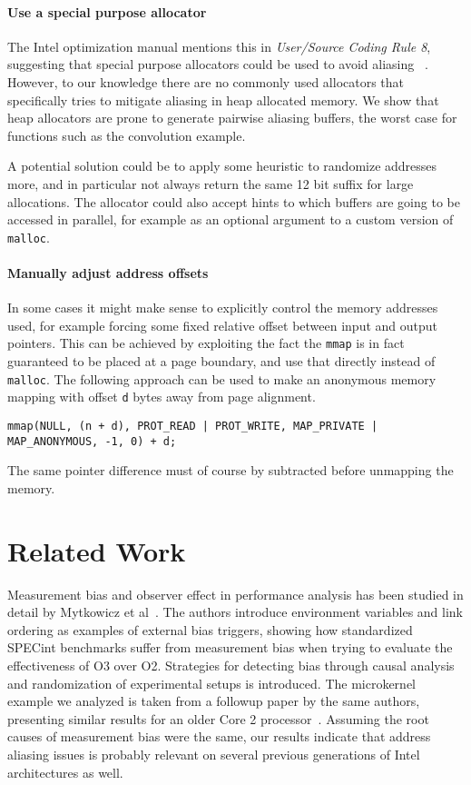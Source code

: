 \documentclass[prodmode,acmtaco]{acmsmall}
\begin{document}
\paragraph{Use a special purpose allocator}
The Intel optimization manual mentions this in \emph{User/Source Coding Rule 8}, suggesting that special purpose allocators could be used to avoid aliasing ~\cite{OptimizationManual}.
However, to our knowledge there are no commonly used allocators that specifically tries to mitigate aliasing in heap allocated memory.
We show that heap allocators are prone to generate pairwise aliasing buffers, the worst case for functions such as the convolution example.

A potential solution could be to apply some heuristic to randomize addresses more, and in particular not always return the same 12 bit suffix for large allocations.
The allocator could also accept hints to which buffers are going to be accessed in parallel, for example as an optional argument to a custom version of \texttt{malloc}.


\paragraph{Manually adjust address offsets}
In some cases it might make sense to explicitly control the memory addresses used, for example forcing some fixed relative offset between input and output pointers.
This can be achieved by exploiting the fact the \texttt{mmap} is in fact guaranteed to be placed at a page boundary, and use that directly instead of \texttt{malloc}.
The following approach can be used to make an anonymous memory mapping with offset \texttt{d} bytes away from page alignment.
\begin{lstlisting}[breaklines=true]
    mmap(NULL, (n + d), PROT_READ | PROT_WRITE, MAP_PRIVATE | MAP_ANONYMOUS, -1, 0) + d;
\end{lstlisting}
The same pointer difference must of course by subtracted before unmapping the memory.


\section{Related Work}
\label{sec:related}
Measurement bias and observer effect in performance analysis has been studied in detail by Mytkowicz et al~.
The authors introduce environment variables and link ordering as examples of external bias triggers, showing how standardized {\small SPECint} benchmarks suffer from measurement bias when trying to evaluate the effectiveness of O3 over O2. 
Strategies for detecting bias through causal analysis and randomization of experimental setups is introduced.
The microkernel example we analyzed is taken from a followup paper by the same authors, presenting similar results for an older Core 2 processor~\cite{Mytkowicz:2009:WrongData}.
Assuming the root causes of measurement bias were the same, our results indicate that address aliasing issues is probably relevant on several previous generations of Intel architectures as well.
\end{document}
